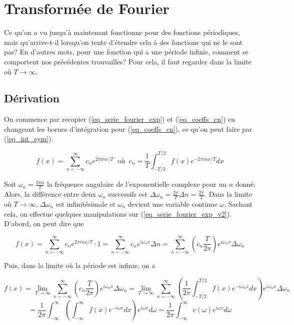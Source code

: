 \newpage
\section{Transformée de Fourier}
Ce qu'on a vu jusqu'à maintenant fonctionne pour des fonctions périodiques, mais qu'arrive-t-il lorsqu'on tente d'étendre cela à des fonctions qui ne le sont pas? En d'autres mots, pour une fonction qui a une période infinie, comment se comportent nos précédentes trouvailles? Pour cela, il faut regarder dans la limite où $T \rightarrow \infty$. 

\subsection{Dérivation}
On commence par recopier (\ref{eq_serie_fourier_exp}) et (\ref{eq_coeffs_cn}) en changeant les bornes d'intégration pour (\ref{eq_coeffs_cn}), ce qu'on peut faire par (\ref{eq_int_sym}).

\begin{equation}
    f(x) = \sum_{n = -\infty}^{\infty}c_ne^{2\pi inx/T} \ \text{ où } \ c_n = \frac{1}{T}\int_{-T/2}^{T/2}f(x)e^{-2\pi inx/T}dx
    \label{eq_serie_fourier_exp_v2}
\end{equation}

Soit $\omega_n = \frac{2\pi n}{T}$ la fréquence angulaire de l'exponentielle complexe pour un $n$ donné. Alors, la différence entre deux $\omega_n$ successifs est $\Delta \omega_n = \frac{2\pi}{T}\Delta n = \frac{2\pi}{T}$. Dans la limite où $T \rightarrow \infty$, $\Delta \omega_n$ est infinitésimale et $\omega_n$ devient une variable continue $\omega$. Sachant cela, on effectue quelques manipulations sur (\ref{eq_serie_fourier_exp_v2}). D'abord, on peut dire que

\begin{equation*}
    f(x) = \sum_{n = -\infty}^{\infty}c_ne^{2\pi inx/T} \cdot 1 = \sum_{n = -\infty}^{\infty}c_ne^{i\omega_nx} \Delta n = \sum_{n = -\infty}^{\infty}\left(c_n\frac{T}{2\pi}\right)e^{i\omega_nx}\Delta \omega_n  
\end{equation*}

Puis, dans la limite où la période est infinie, on a 

\begin{equation*}
    f(x) = \lim_{T\rightarrow\infty}\sum_{n = -\infty}^{\infty}\left(c_n\frac{T}{2\pi}\right)e^{i\omega_nx}\Delta \omega_n = \lim_{T\rightarrow\infty}\sum_{n = -\infty}^{\infty}\left(\frac{1}{2\pi}\int_{-T/2}^{T/2}f(x)e^{-i\omega_nx}dx\right) e^{i\omega_nx}\Delta \omega_n
\end{equation*}
\begin{equation}
    = \frac{1}{2\pi}\int_{-\infty}^{\infty}\left(\int_{-\infty}^{\infty}f(x)e^{-i\omega x}dx\right)e^{i\omega x}d\omega = \frac{1}{2\pi}\int_{-\infty}^{\infty}c(\omega)e^{i\omega x}d\omega 
    \label{eq_TFI}
\end{equation}

